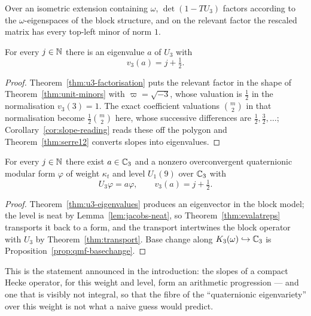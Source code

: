 \begin{theorem}
  \label{thm:u3-factorisation}
  \leanok
  Over an isometric extension containing $\omega$, $\det(1 - TU_3)$ factors according to the
  $\omega$-eigenspaces of the block structure, and on the relevant factor the rescaled matrix has
  every top-left minor of norm $1$.
\end{theorem}

\begin{theorem}
  \label{thm:u3-eigenvalues}
  \leanok
  For every $j \in \mathbb{N}$ there is an eigenvalue $a$ of $U_3$ with
  \[
    v_3(a) = j + \tfrac12 .
  \]
\end{theorem}

\begin{proof}
  \leanok
  Theorem~\ref{thm:u3-factorisation} puts the relevant factor in the shape of
  Theorem~\ref{thm:unit-minors} with $\varpi = \sqrt{-3}$, whose valuation is $\tfrac12$ in the
  normalisation $v_3(3) = 1$.  The exact coefficient valuations $\binom m2$ in that normalisation
  become $\tfrac12\binom m2$ here, whose successive differences are $\tfrac12, \tfrac32, \dots$;
  Corollary~\ref{cor:slope-reading} reads these off the polygon and
  Theorem~\ref{thm:serre12} converts slopes into eigenvalues.
\end{proof}

\begin{theorem}
  \label{thm:u3-eigenforms}
  \leanok
  For every $j \in \mathbb{N}$ there exist $a \in \mathbb{C}_3$ and a nonzero overconvergent quaternionic
  modular form $\varphi$ of weight $\kappa_t$ and level $U_1(9)$ over $\mathbb{C}_3$ with
  \[
    U_3 \varphi = a\varphi, \qquad v_3(a) = j + \tfrac12 .
  \]
\end{theorem}

\begin{proof}
  \leanok
  Theorem~\ref{thm:u3-eigenvalues} produces an eigenvector in the block model; the level is neat
  by Lemma~\ref{lem:jacobs-neat}, so Theorem~\ref{thm:evalatreps} transports it back to a form,
  and the transport intertwines the block operator with $U_3$ by Theorem~\ref{thm:transport}.
  Base change along $K_3(\omega) \hookrightarrow \mathbb{C}_3$ is
  Proposition~\ref{prop:qmf-basechange}.
\end{proof}

This is the statement announced in the introduction: the slopes of a compact Hecke operator, for
this weight and level, form an arithmetic progression --- and one that is visibly not integral,
so that the fibre of the ``quaternionic eigenvariety'' over this weight is not what a naive guess
would predict.
